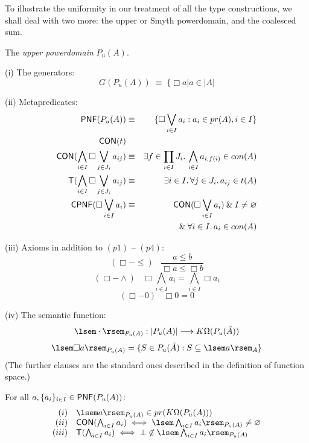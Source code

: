 To illustrate the uniformity in our treatment of all the type constructions, we shall deal with two more: the upper or Smyth powerdomain, and the coalesced sum.

\begin{definition} 
{\rm The {\it upper powerdomain} $P_{u}(A)$.

\noindent (i) The generators:
\[ G(P_{u}(A)) \; \equiv \; \{ \Box a | a \in |A| \]

\noindent (ii) Metapredicates:
\begin{eqnarray*}
{\sf PNF}(P_{u}(A)) & \equiv & \{ \Box \bigvee_{i \in I}a_{i} : a_{i} \in pr(A), i \in I \} \\
{\sf CON}(t) & & \\
{\sf CON}(\bigwedge_{i \in I} \Box \bigvee_{j \in J_{i}} a_{ij}) & \equiv & \exists 
f \in \prod_{i \in I}J_{i}. \, \bigwedge_{i \in I}a_{i, f(i)} \in con(A) \\
{\sf T}(\bigwedge_{i \in I} \Box \bigvee_{j \in J_{i}} a_{ij}) & \equiv & \exists i \in I. \, \forall j \in J_{i}. \, a_{ij} \in t(A) \\
{\sf CPNF}( \Box \bigvee_{i \in I}a_{i}) & \equiv & {\sf CON}(\Box \bigvee_{i \in I}a_{i}) 
\: \& \: I \neq \varnothing \\
& & \& \: \forall i \in I. \, a_{i} \in con(A)
\end{eqnarray*} 

\noindent (iii) Axioms in addition to $(p1)$ -- $(p4)$:
\[ (\Box - \leq) \;\;\; \frac{a \leq b}{\Box a \leq \Box b} \]
\[ (\Box - \wedge) \;\;\; \Box \bigwedge_{i \in I}a_{i} = \bigwedge_{i \in I} \Box a_{i} \]
\[ (\Box - 0) \;\;\; \Box 0 = 0 \]

\noindent (iv) The semantic function:
\[ \lsem \cdot \rsem_{P_{u}(A)} : | P_{u}(A) | \longrightarrow K\Omega (P_{u}(\hat{A})) \]
\[ \lsem \Box a \rsem_{P_{u}(A)} = \{ S \in P_{u}(\hat{A}) : S \subseteq \lsem a \rsem_{A} \} \]
(The further clauses are the standard ones described in the definition of function space.)}
\end{definition}
\begin{proposition}[T1]
\label{pdomT1}
For all $a, \{ a_{i}\}_{i \in I} \in {\sf PNF}(P_{u}(A))$:
\[ \begin{array}{rl}
(i)   & \lsem a \rsem_{P_{u}(A)} \in pr(K\Omega (P_{u}(A))) \\
(ii)  & {\sf CON}(\bigwedge_{i \in I}a_{i}) \; \Longleftrightarrow \; \lsem \bigwedge_{i \in I}a_{i} \rsem_{P_{u}(A)} \neq \varnothing \\
(iii) & {\sf T}(\bigwedge_{i \in I}a_{i}) \; \Longleftrightarrow \; \bot \not\in \lsem \bigwedge_{i \in I}a_{i} \rsem_{P_{u}(A)}  \\
\end{array} \]
\end{proposition}

